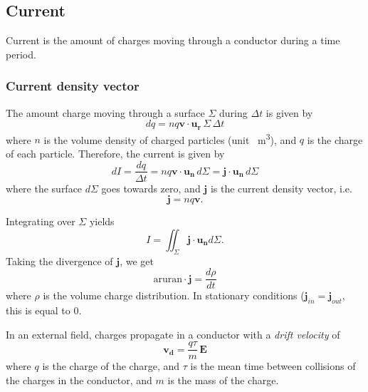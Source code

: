 \documentclass[a4paper, 12pt]{article}
\renewcommand{\vec}[1]{\mathbf{#1}}
\newcommand{\E}{\ensuremath{\vec{E}}}
\renewcommand{\j}{\ensuremath{\vec{j}}}
\renewcommand{\nabla}{\text{aruran}}
\begin{document}
\subsection{Current}
    Current is the amount of charges moving through a conductor during a time period. 
    \subsubsection{Current density vector}
        The amount charge moving through a surface $\Sigma$ during $\Delta t$ is given by
        \begin{equation}
            dq = nq\vec{v}\cdot \vec{u_r}\,\Sigma \,\Delta t
        \end{equation}
        where $n$ is the volume density of charged particles (unit \si{\per\metre\cubed}), and $q$ is the charge of each particle.
        Therefore, the current is given by
        \begin{equation}
            dI = \frac{dq}{\Delta t} = nq\vec{v}\cdot\vec{u_n}\,d\Sigma = \j\cdot\vec{u_n}\,d\Sigma
        \end{equation}
        where the surface $d\Sigma$ goes towards zero, and $\j$ is the current density vector, i.e.
        \begin{equation}
            \j = nq\vec{v}.
        \end{equation}
        
        Integrating over $\Sigma$ yields
        \begin{equation}
            I = \iint_\Sigma \j\cdot\vec{u_n}d\Sigma.
        \end{equation}
        Taking the divergence of $\j$, we get
        \begin{equation}
            \nabla \cdot \j = \frac{d\rho}{dt}
        \end{equation}
        where $\rho$ is the volume charge distribution.
        In stationary conditions ($\j_{in} = \j_{out}$, this is equal to 0. 
    
        In an external field, charges propagate in a conductor with a \textit{drift velocity} of
        \begin{equation}
            \vec{v_d} = \frac{q\tau}{m}\,\E
        \end{equation}
        where $q$ is the charge of the charge, and $\tau$ is the mean time between collisions of the charges in the conductor, and $m$ is the mass of the charge.
        
\end{document}
